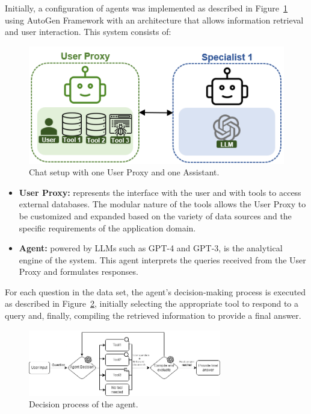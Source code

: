             Initially, a configuration of agents was implemented as described in Figure~\ref{fig:agent_config_1} using AutoGen Framework \citep{Wu2023} with an architecture that allows information retrieval and user interaction. This system consists of:

            \begin{figure}[h]
                \centering
                \includegraphics[width=.5\textwidth]{images/agent_config_1.png}
                \caption{Chat setup with one User Proxy \citep{Wu2023} and one Assistant.}
                \label{fig:agent_config_1}
            \end{figure}
            

            \begin{itemize}        
                        
                \item \textbf{User Proxy:} represents the interface with the user and with tools to access external databases. The modular nature of the tools allows the User Proxy to be customized and expanded based on the variety of data sources and the specific requirements of the application domain.

                \item \textbf{Agent:} powered by LLMs such as GPT-4 and GPT-3, is the analytical engine of the system. This agent interprets the queries received from the User Proxy and formulates responses.
                                    
            \end{itemize}

            
            For each question in the data set, the agent's decision-making process is executed as described in Figure~\ref{fig:diagrama_agente_1}, initially selecting the appropriate tool to respond to a query and, finally, compiling the retrieved information to provide a final answer.
            
            \begin{figure}[h]
                \centering
                \includegraphics[width=0.75\textwidth]{images/agent_diagram_1.png}
                \caption{Decision process of the agent.}
                \label{fig:diagrama_agente_1}
            \end{figure}                        
                    
